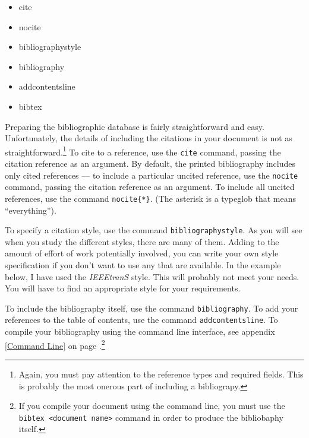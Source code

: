         \begin{cmd}
            \begin{itemize}
                \item{cite}
                \item{nocite}
                \item{bibliographystyle}
                \item{bibliography}
                \item{addcontentsline}
                \item{bibtex}
            \end{itemize}
        \end{cmd}

        Preparing the bibliographic database is fairly straightforward and easy. Unfortunately, the details of including the citations in your document is not as straightforward.\footnote{Again, you must pay attention to the reference types and required fields. This is probably the most onerous part of including a bibliograpy.} To cite to a reference, use the \texttt{cite} command, passing the citation reference as an argument. By default, the printed bibliography includes only cited references --- to include a particular uncited reference, use the \texttt{nocite} command, passing the citation reference as an argument. To include all uncited references, use the command \texttt{nocite\{*\}}. (The asterisk is a typeglob that means ``everything'').

        To specify a citation style, use the command \texttt{bibliographystyle}. As you will see when you study the different styles, there are many of them. Adding to the amount of effort of work potentially involved, you can write your own style specification if you don't want to use any that are available. In the example below, I have used the \textit{IEEEtranS} style. This will probably not meet your needs. You will have to find an appropriate style for your requirements.

        To include the bibliography itself, use the command \texttt{bibliography}. To add your references to the table of contents, use the command \texttt{addcontentsline}. To compile your bibliography using the command line interface, see appendix \ref{Command Line} on page \pageref{Command Line}.\footnote{If you compile your document using the command line, you must use the \texttt{bibtex <document name>} command in order to produce the bibliobaphy itself.}
        
